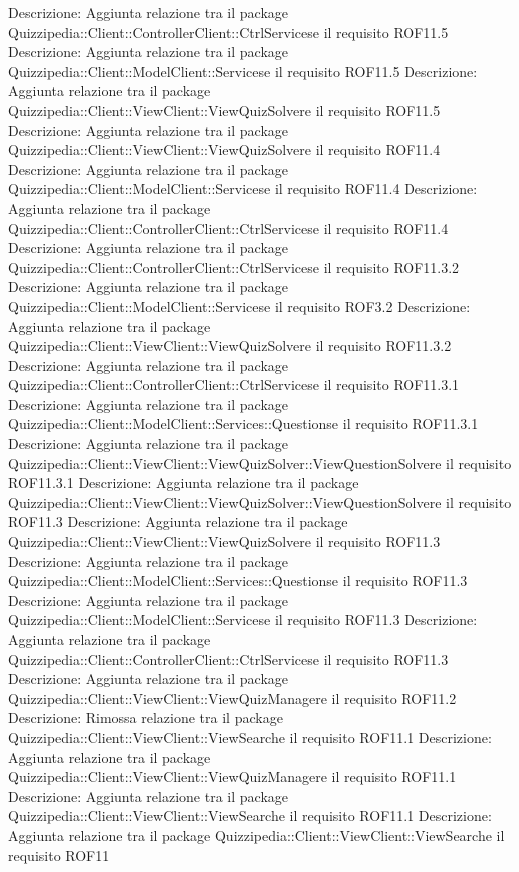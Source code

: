 Descrizione: Aggiunta relazione tra il package Quizzipedia::Client::ControllerClient::CtrlServicese il requisito ROF11.5 
Descrizione: Aggiunta relazione tra il package Quizzipedia::Client::ModelClient::Servicese il requisito ROF11.5 
Descrizione: Aggiunta relazione tra il package Quizzipedia::Client::ViewClient::ViewQuizSolvere il requisito ROF11.5 
Descrizione: Aggiunta relazione tra il package Quizzipedia::Client::ViewClient::ViewQuizSolvere il requisito ROF11.4 
Descrizione: Aggiunta relazione tra il package Quizzipedia::Client::ModelClient::Servicese il requisito ROF11.4 
Descrizione: Aggiunta relazione tra il package Quizzipedia::Client::ControllerClient::CtrlServicese il requisito ROF11.4 
Descrizione: Aggiunta relazione tra il package Quizzipedia::Client::ControllerClient::CtrlServicese il requisito ROF11.3.2 
Descrizione: Aggiunta relazione tra il package Quizzipedia::Client::ModelClient::Servicese il requisito ROF3.2 
Descrizione: Aggiunta relazione tra il package Quizzipedia::Client::ViewClient::ViewQuizSolvere il requisito ROF11.3.2 
Descrizione: Aggiunta relazione tra il package Quizzipedia::Client::ControllerClient::CtrlServicese il requisito ROF11.3.1 
Descrizione: Aggiunta relazione tra il package Quizzipedia::Client::ModelClient::Services::Questionse il requisito ROF11.3.1 
Descrizione: Aggiunta relazione tra il package Quizzipedia::Client::ViewClient::ViewQuizSolver::ViewQuestionSolvere il requisito ROF11.3.1 
Descrizione: Aggiunta relazione tra il package Quizzipedia::Client::ViewClient::ViewQuizSolver::ViewQuestionSolvere il requisito ROF11.3 
Descrizione: Aggiunta relazione tra il package Quizzipedia::Client::ViewClient::ViewQuizSolvere il requisito ROF11.3 
Descrizione: Aggiunta relazione tra il package Quizzipedia::Client::ModelClient::Services::Questionse il requisito ROF11.3 
Descrizione: Aggiunta relazione tra il package Quizzipedia::Client::ModelClient::Servicese il requisito ROF11.3 
Descrizione: Aggiunta relazione tra il package Quizzipedia::Client::ControllerClient::CtrlServicese il requisito ROF11.3 
Descrizione: Aggiunta relazione tra il package Quizzipedia::Client::ViewClient::ViewQuizManagere il requisito ROF11.2 
Descrizione: Rimossa relazione tra il package Quizzipedia::Client::ViewClient::ViewSearche il requisito ROF11.1 
Descrizione: Aggiunta relazione tra il package Quizzipedia::Client::ViewClient::ViewQuizManagere il requisito ROF11.1 
Descrizione: Aggiunta relazione tra il package Quizzipedia::Client::ViewClient::ViewSearche il requisito ROF11.1 
Descrizione: Aggiunta relazione tra il package Quizzipedia::Client::ViewClient::ViewSearche il requisito ROF11 
